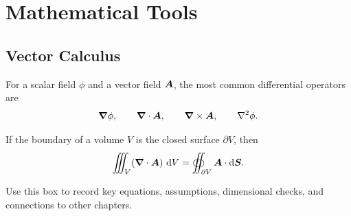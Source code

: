 \documentclass[../main.tex]{subfiles}
\begin{document}
\chapter{Mathematical Tools}
\label{chap:math-tools}

\section{Vector Calculus}

For a scalar field $\phi$ and a vector field $\bm{A}$, the most common
differential operators are
\begin{equation}
  \bm{\nabla} \phi, \qquad
  \bm{\nabla} \cdot \bm{A}, \qquad
  \bm{\nabla} \times \bm{A}, \qquad
  \nabla^2 \phi.
  \label{eq:vector-operators}
\end{equation}

\begin{theorem}
  If the boundary of a volume $V$ is the closed surface $\partial V$, then
  \begin{equation}
    \iiint_V (\bm{\nabla}\cdot\bm{A})\,\mathop{}\!\mathrm{d} V
    = \oiint_{\partial V} \bm{A}\cdot\mathop{}\!\mathrm{d}\bm{S}.
  \end{equation}
\end{theorem}

\begin{summarybox}
  Use this box to record key equations, assumptions, dimensional checks, and
  connections to other chapters.
\end{summarybox}
\end{document}
